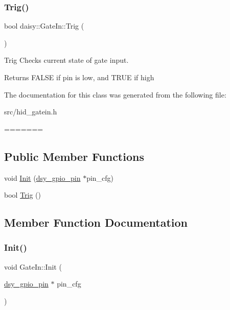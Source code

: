 \subsubsection{\texorpdfstring{Trig()}{Trig()}}
{\footnotesize\ttfamily bool daisy\+::\+Gate\+In\+::\+Trig (\begin{DoxyParamCaption}{ }\end{DoxyParamCaption})}

Trig Checks current state of gate input. \begin{DoxyReturn}{Returns}
F\+A\+L\+SE if pin is low, and T\+R\+UE if high 
\end{DoxyReturn}


The documentation for this class was generated from the following file\+:\begin{DoxyCompactItemize}
\item 
src/hid\+\_\+gatein.\+h\end{DoxyCompactItemize}
=======
\subsection*{Public Member Functions}
\begin{DoxyCompactItemize}
\item 
void \hyperlink{classdaisy_1_1_gate_in_a9c5be0b05ed9c2aaa994bfe17fd5f86c}{Init} (\hyperlink{structdsy__gpio__pin}{dsy\+\_\+gpio\+\_\+pin} $\ast$pin\+\_\+cfg)
\item 
bool \hyperlink{classdaisy_1_1_gate_in_a1be8327985451bd0695db1dd7e207315}{Trig} ()
\end{DoxyCompactItemize}


\subsection{Member Function Documentation}
\mbox{\label{classdaisy_1_1_gate_in_a9c5be0b05ed9c2aaa994bfe17fd5f86c}} 
\subsubsection{\texorpdfstring{Init()}{Init()}}
{\footnotesize\ttfamily void Gate\+In\+::\+Init (\begin{DoxyParamCaption}\item[{\hyperlink{structdsy__gpio__pin}{dsy\+\_\+gpio\+\_\+pin} $\ast$}]{pin\+\_\+cfg }\end{DoxyParamCaption})}

